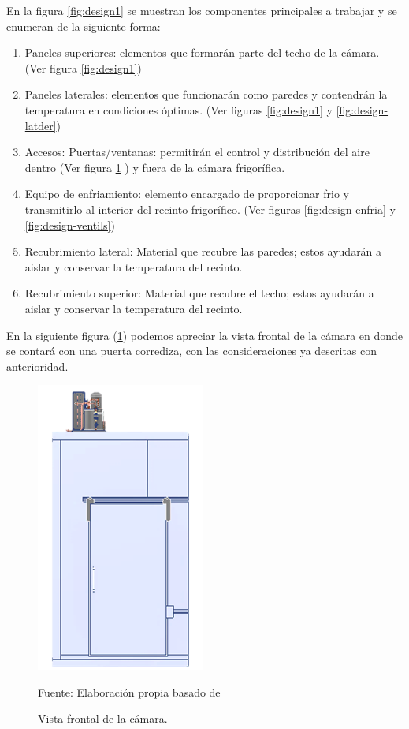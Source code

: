 En la figura \ref{fig:design1} se muestran los componentes principales a trabajar y se enumeran de  la siguiente forma:
\begin{enumerate}
	\item  Paneles superiores: elementos que formarán parte del techo de la cámara. (Ver figura \ref{fig:design1})
	\item  Paneles laterales: elementos que funcionarán como paredes y contendrán la
	temperatura en condiciones óptimas. (Ver figuras \ref{fig:design1} y \ref{fig:design-latder})
	\item  Accesos: Puertas/ventanas: permitirán el control y distribución del aire dentro (Ver figura \ref{fig:design-front} )
	y fuera de la cámara frigorífica.
	\item  Equipo de enfriamiento: elemento encargado de proporcionar frio y 
	transmitirlo al interior del recinto frigorífico. (Ver figuras \ref{fig:design-enfria} y \ref{fig:design-ventils})
	\item  Recubrimiento lateral: Material que recubre las paredes; estos ayudarán a 
	aislar y conservar la temperatura del recinto.
	\item  Recubrimiento superior: Material que recubre el techo; estos ayudarán a 
	aislar y conservar la temperatura del recinto.
\end{enumerate}
En la siguiente figura (\ref{fig:design-front}) podemos apreciar la vista frontal de la cámara en donde se contará con una puerta corrediza, con las consideraciones ya descritas con anterioridad.
 
 \begin{figure}[H]
	\centering
	\includegraphics[width=0.3125\linewidth]{figures/design-front}
	\caption{Vista frontal de la cámara.} Fuente: Elaboración propia basado de 
	\label{fig:design-front}
\end{figure}



